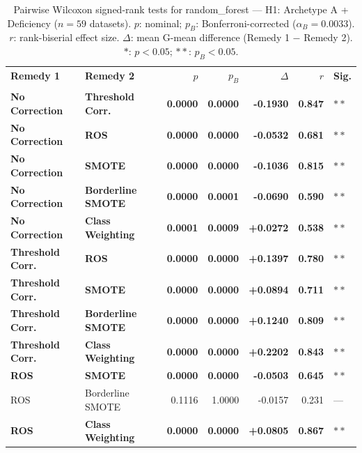 \begin{table}[ht]
\centering
\scriptsize
\caption{Pairwise Wilcoxon signed-rank tests for random_forest --- H1: Archetype A + Deficiency ($n=59$ datasets). $p$: nominal; $p_B$: Bonferroni-corrected ($\alpha_B=0.0033$). $r$: rank-biserial effect size. $\Delta$: mean G-mean difference (Remedy 1 $-$ Remedy 2). $\ast$: $p<0.05$; $\ast\ast$: $p_B<0.05$.}
\label{tab:wilcoxon_random_forest_h1}
\begin{tabular}{llrrrrl}
\toprule
\textbf{Remedy 1} & \textbf{Remedy 2} & \textbf{$p$} & \textbf{$p_B$} & \textbf{$\Delta$} & \textbf{$r$} & \textbf{Sig.} \\\\
\midrule
    \textbf{No Correction} & \textbf{Threshold Corr.} & \textbf{0.0000} & \textbf{0.0000} & \textbf{-0.1930} & \textbf{0.847} & $\ast\ast$ \\
    \textbf{No Correction} & \textbf{ROS} & \textbf{0.0000} & \textbf{0.0000} & \textbf{-0.0532} & \textbf{0.681} & $\ast\ast$ \\
    \textbf{No Correction} & \textbf{SMOTE} & \textbf{0.0000} & \textbf{0.0000} & \textbf{-0.1036} & \textbf{0.815} & $\ast\ast$ \\
    \textbf{No Correction} & \textbf{Borderline SMOTE} & \textbf{0.0000} & \textbf{0.0001} & \textbf{-0.0690} & \textbf{0.590} & $\ast\ast$ \\
    \textbf{No Correction} & \textbf{Class Weighting} & \textbf{0.0001} & \textbf{0.0009} & \textbf{+0.0272} & \textbf{0.538} & $\ast\ast$ \\
    \textbf{Threshold Corr.} & \textbf{ROS} & \textbf{0.0000} & \textbf{0.0000} & \textbf{+0.1397} & \textbf{0.780} & $\ast\ast$ \\
    \textbf{Threshold Corr.} & \textbf{SMOTE} & \textbf{0.0000} & \textbf{0.0000} & \textbf{+0.0894} & \textbf{0.711} & $\ast\ast$ \\
    \textbf{Threshold Corr.} & \textbf{Borderline SMOTE} & \textbf{0.0000} & \textbf{0.0000} & \textbf{+0.1240} & \textbf{0.809} & $\ast\ast$ \\
    \textbf{Threshold Corr.} & \textbf{Class Weighting} & \textbf{0.0000} & \textbf{0.0000} & \textbf{+0.2202} & \textbf{0.843} & $\ast\ast$ \\
    \textbf{ROS} & \textbf{SMOTE} & \textbf{0.0000} & \textbf{0.0000} & \textbf{-0.0503} & \textbf{0.645} & $\ast\ast$ \\
    ROS & Borderline SMOTE & 0.1116 & 1.0000 & -0.0157 & 0.231 & --- \\
    \textbf{ROS} & \textbf{Class Weighting} & \textbf{0.0000} & \textbf{0.0000} & \textbf{+0.0805} & \textbf{0.867} & $\ast\ast$ \\

\end{tabular}
\end{table}
